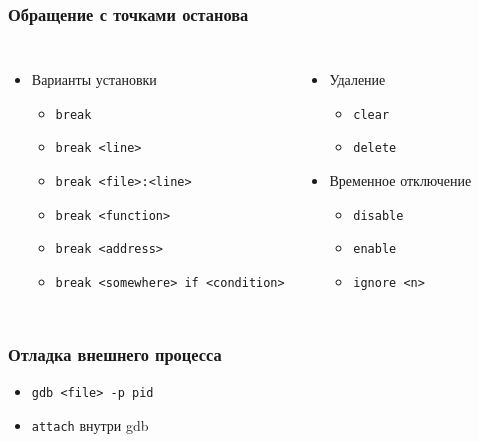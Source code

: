 \begin{frame}
 \frametitle{Обращение с точками останова}
 \begin{columns}
 \begin{itemize}
   \item{Варианты установки}
   \begin{itemize}
     \item \texttt{break}
     \item \texttt{break <line>}
     \item \texttt{break <file>:<line>}
     \item \texttt{break <function>}
     \item \texttt{break <address>}
     \item \texttt{break <somewhere> if <condition>}
   \end{itemize}
\end{itemize}
  \begin{itemize}   
    \item Удаление
     \begin{itemize}
       \item \texttt{clear} 
       \item \texttt{delete}
     \end{itemize}
     \item Временное отключение
     \begin{itemize}
       \item \texttt{disable}
       \item \texttt{enable}
       \item \texttt{ignore <n>}
     \end{itemize}
  \end{itemize}
\end{columns}
\end{frame}

\begin{frame}
 \frametitle{Отладка внешнего процесса}
 \begin{itemize}
   \item \texttt{gdb <file> -p pid}
   \item \texttt{attach} внутри gdb 
 \end{itemize} 
\end{frame}

